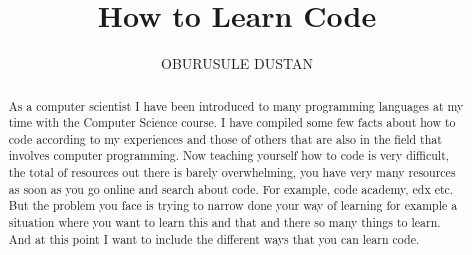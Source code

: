 \documentclass{article}
\begin{document}
\title{How to Learn Code{}}
\author{OBURUSULE DUSTAN}
\maketitle
\begin{abstract}
As a computer scientist I have been introduced to many programming languages at my time with the Computer Science course. I have compiled some few facts about how to code according to my experiences and those of others that are also in the field that involves computer programming. Now teaching yourself how to code is very difficult, the total of resources out there is barely overwhelming, you have very many resources as soon as you go online and search about code. For example, code academy, edx etc.
But the problem you face is trying to narrow done your way of learning for example a situation where you want to learn this and that and there so many things to learn. And at this point I want to include the different ways that you can learn code.
\end{abstract}
\end{document}
